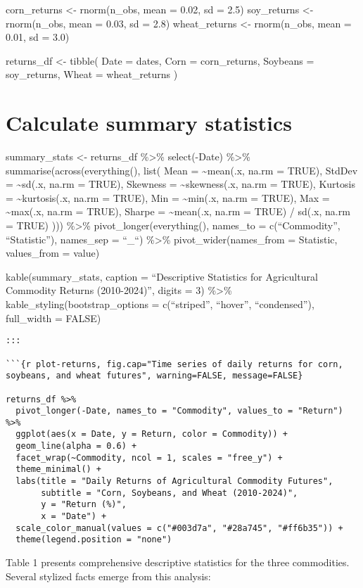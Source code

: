 \documentclass[
  10pt,
  a4paper,
]{article}
\begin{document}
\begin{tcolorbox}
corn\_returns \textless- rnorm(n\_obs, mean = 0.02, sd = 2.5)
soy\_returns \textless- rnorm(n\_obs, mean = 0.03, sd = 2.8)
wheat\_returns \textless- rnorm(n\_obs, mean = 0.01, sd = 3.0)

returns\_df \textless- tibble( Date = dates, Corn = corn\_returns,
Soybeans = soy\_returns, Wheat = wheat\_returns )

\section{Calculate summary
statistics}\label{calculate-summary-statistics}

summary\_stats \textless- returns\_df \%\textgreater\% select(-Date)
\%\textgreater\% summarise(across(everything(), list( Mean =
\textasciitilde mean(.x, na.rm = TRUE), StdDev = \textasciitilde sd(.x,
na.rm = TRUE), Skewness = \textasciitilde skewness(.x, na.rm = TRUE),
Kurtosis = \textasciitilde kurtosis(.x, na.rm = TRUE), Min =
\textasciitilde min(.x, na.rm = TRUE), Max = \textasciitilde max(.x,
na.rm = TRUE), Sharpe = \textasciitilde mean(.x, na.rm = TRUE) / sd(.x,
na.rm = TRUE) ))) \%\textgreater\% pivot\_longer(everything(), names\_to
= c(``Commodity'', ``Statistic''), names\_sep = ``\_``) \%\textgreater\%
pivot\_wider(names\_from = Statistic, values\_from = value)

kable(summary\_stats, caption = ``Descriptive Statistics for
Agricultural Commodity Returns (2010-2024)'', digits = 3)
\%\textgreater\% kable\_styling(bootstrap\_options = c(``striped'',
``hover'', ``condensed''), full\_width = FALSE)

\begin{verbatim}
:::

```{r plot-returns, fig.cap="Time series of daily returns for corn, soybeans, and wheat futures", warning=FALSE, message=FALSE}

returns_df %>%
  pivot_longer(-Date, names_to = "Commodity", values_to = "Return") %>%
  ggplot(aes(x = Date, y = Return, color = Commodity)) +
  geom_line(alpha = 0.6) +
  facet_wrap(~Commodity, ncol = 1, scales = "free_y") +
  theme_minimal() +
  labs(title = "Daily Returns of Agricultural Commodity Futures",
       subtitle = "Corn, Soybeans, and Wheat (2010-2024)",
       y = "Return (%)",
       x = "Date") +
  scale_color_manual(values = c("#003d7a", "#28a745", "#ff6b35")) +
  theme(legend.position = "none")
\end{verbatim}

Table 1 presents comprehensive descriptive statistics for the three
commodities. Several stylized facts emerge from this analysis:


\end{tcolorbox}
\end{document}
